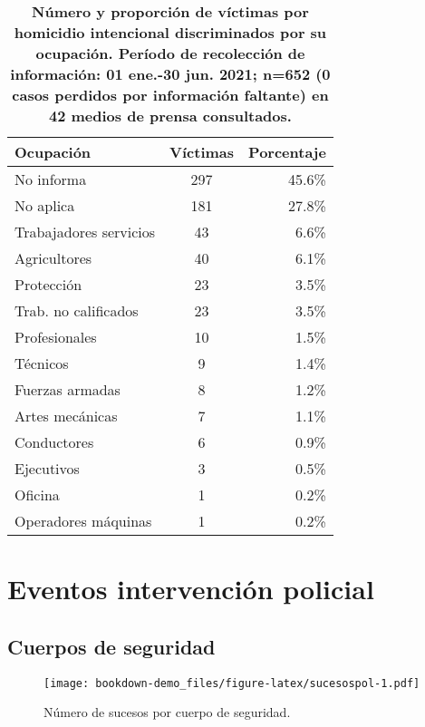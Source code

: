 \documentclass[
]{book}
\begin{document}
\begin{table}

\caption{\label{tab:victimasdelhiocupaciontable}\textbf{Número y proporción de víctimas por homicidio intencional discriminados por su ocupación. Período de recolección de información: 01 ene.-30 jun. 2021; n=652 (0 casos perdidos por información faltante) en 42 medios de prensa consultados.}}
\centering
\begin{tabular}[t]{lcr}
\toprule
Ocupación & Víctimas & Porcentaje\\
\midrule
No informa & 297 & 45.6\%\\
No aplica & 181 & 27.8\%\\
Trabajadores servicios & 43 & 6.6\%\\
Agricultores & 40 & 6.1\%\\
Protección & 23 & 3.5\%\\
\addlinespace
Trab. no calificados & 23 & 3.5\%\\
Profesionales & 10 & 1.5\%\\
Técnicos & 9 & 1.4\%\\
Fuerzas armadas & 8 & 1.2\%\\
Artes mecánicas & 7 & 1.1\%\\
\addlinespace
Conductores & 6 & 0.9\%\\
Ejecutivos & 3 & 0.5\%\\
Oficina & 1 & 0.2\%\\
Operadores máquinas & 1 & 0.2\%\\
\bottomrule
\end{tabular}
\end{table}

\hypertarget{eventos-intervenciuxf3n-policial}{%
\chapter{Eventos intervención policial}\label{eventos-intervenciuxf3n-policial}}

\hypertarget{cuerpos-de-seguridad}{%
\section{Cuerpos de seguridad}\label{cuerpos-de-seguridad}}



\begin{figure}
\centering
\texttt{[image: bookdown-demo\_files/figure-latex/sucesospol-1.pdf]}
\caption{\label{fig:sucesospol}Número de sucesos por cuerpo de seguridad.}
\end{figure}
\end{document}
